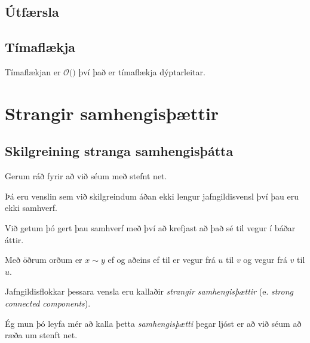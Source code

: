 \subsection{Útfærsla}
{
}

\subsection{Tímaflækja}
{
	{
		\item<1-> Tímaflækjan er $\mathcal{O}($$)$ því það er tímaflækja dýptarleitar.
	}
}

\section{Strangir samhengisþættir}
\subsection{Skilgreining stranga samhengisþátta}
{
	{
		\item<1-> Gerum ráð fyrir að við séum með stefnt net.
		\item<2-> Þá eru venslin sem við skilgreindum áðan ekki lengur jafngildisvensl því þau eru ekki samhverf.
		\item<3-> Við getum þó gert þau samhverf með því að krefjast að það sé til vegur í báðar áttir.
		\item<4-> Með öðrum orðum er $x \sim y$ ef og aðeins ef til er vegur frá $u$ til $v$ og vegur frá $v$ til $u$.
		\item<5-> Jafngildisflokkar þessara vensla eru kallaðir \emph{strangir samhengisþættir} (e. \emph{strong connected components}).
		\item<6-> Ég mun þó leyfa mér að kalla þetta \emph{samhengisþætti} þegar ljóst er að við séum að ræða um stenft net.
	}
}

